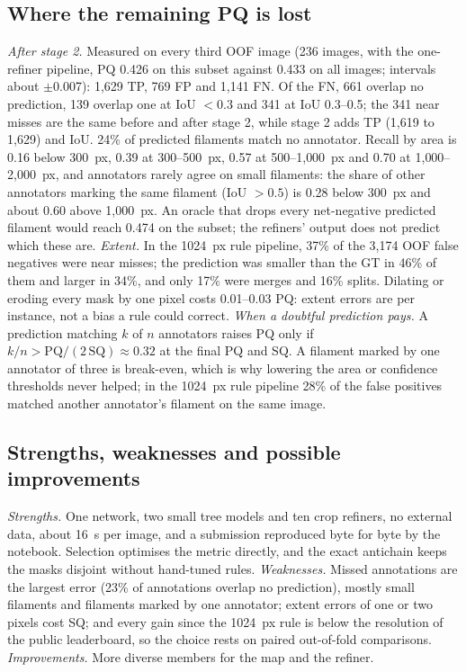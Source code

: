 \documentclass[sigconf]{acmart}
\begin{document}
\subsection{Where the remaining PQ is lost}\label{sec:loss}
\emph{After stage 2.} Measured on every third OOF image (236 images, with the one-refiner pipeline, PQ 0.426 on this subset against 0.433 on all images; intervals about $\pm$0.007): 1{,}629 TP, 769 FP and 1{,}141 FN. Of the FN, 661 overlap no prediction, 139 overlap one at IoU $<0.3$ and 341 at IoU 0.3--0.5; the 341 near misses are the same before and after stage 2, while stage 2 adds TP (1{,}619 to 1{,}629) and IoU. 24\% of predicted filaments match no annotator. Recall by area is 0.16 below 300~px, 0.39 at 300--500~px, 0.57 at 500--1{,}000~px and 0.70 at 1{,}000--2{,}000~px, and annotators rarely agree on small filaments: the share of other annotators marking the same filament (IoU $>0.5$) is 0.28 below 300~px and about 0.60 above 1{,}000~px. An oracle that drops every net-negative predicted filament would reach 0.474 on the subset; the refiners' output does not predict which these are.
\emph{Extent.} In the 1024~px rule pipeline, 37\% of the 3{,}174 OOF false negatives were near misses; the prediction was smaller than the GT in 46\% of them and larger in 34\%, and only 17\% were merges and 16\% splits. Dilating or eroding every mask by one pixel costs 0.01--0.03 PQ: extent errors are per instance, not a bias a rule could correct.
\emph{When a doubtful prediction pays.} A prediction matching $k$ of $n$ annotators raises PQ only if $k/n > \mathrm{PQ}/(2\,\mathrm{SQ}) \approx 0.32$ at the final PQ and SQ. A filament marked by one annotator of three is break-even, which is why lowering the area or confidence thresholds never helped; in the 1024~px rule pipeline 28\% of the false positives matched another annotator's filament on the same image.

\subsection{Strengths, weaknesses and possible improvements}
\emph{Strengths.} One network, two small tree models and ten crop refiners, no external data, about 16~s per image, and a submission reproduced byte for byte by the notebook. Selection optimises the metric directly, and the exact antichain keeps the masks disjoint without hand-tuned rules.
\emph{Weaknesses.} Missed annotations are the largest error (23\% of annotations overlap no prediction), mostly small filaments and filaments marked by one annotator; extent errors of one or two pixels cost SQ; and every gain since the 1024~px rule is below the resolution of the public leaderboard, so the choice rests on paired out-of-fold comparisons.
\emph{Improvements.} More diverse members for the map and the refiner.
\end{document}
